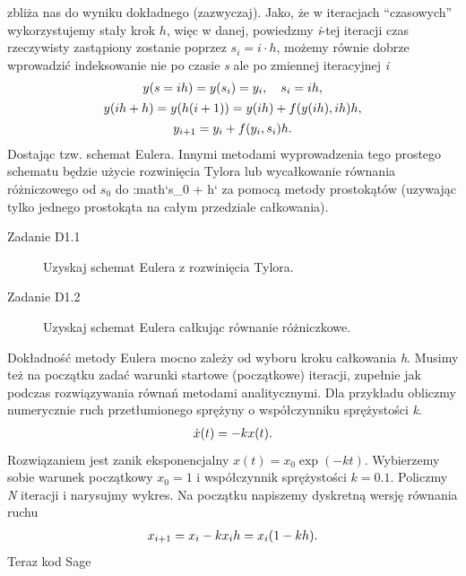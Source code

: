 \documentclass[a4paper,12pt,polish]{sphinxmanual}
\begin{document}
zbliża nas do wyniku dokładnego (zazwyczaj). Jako, że w iteracjach ``czasowych'' wykorzystujemy
stały krok $h$, więc w danej, powiedzmy \emph{i}-tej iteracji czas rzeczywisty zastąpiony zostanie
poprzez $s_i = i \cdot h$, możemy równie dobrze wprowadzić indeksowanie nie po czasie \emph{s} ale
po zmiennej iteracyjnej \emph{i}
\begin{gather}
\begin{split}y (s = ih) = y(s_i) = y_i, \quad s_i = i h,\end{split}\notag\\\begin{split}y (i h + h) = y(h(i+1)) = y(ih) + f(y(ih), ih) h,\end{split}\notag\\\begin{split}y_{i+1} = y_i + f(y_i,s_i) h.\end{split}\notag
\end{gather}
Dostając tzw. schemat Eulera. Innymi metodami wyprowadzenia tego prostego schematu będzie użycie
rozwinięcia Tylora lub wycałkowanie równania różniczowego od $s_0$ do :math{}`s\_0 + h{}`
za pomocą metody prostokątów (uzywając tylko jednego prostokąta na całym przedziale całkowania).
\begin{description}
\item[{Zadanie D1.1}] \leavevmode
Uzyskaj schemat Eulera z rozwinięcia Tylora.

\item[{Zadanie D1.2}] \leavevmode
Uzyskaj schemat Eulera całkując równanie różniczkowe.

\end{description}

Dokładność metody Eulera mocno zależy od wyboru kroku całkowania \emph{h}. Musimy też na początku zadać
warunki startowe (początkowe) iteracji, zupełnie jak podczas rozwiązywania równań metodami analitycznymi.
Dla przykładu obliczmy numerycznie ruch przetłumionego sprężyny o współczynniku sprężystości \emph{k}.
\begin{gather}
\begin{split}\dot{x}(t) = -k x(t).\end{split}\notag
\end{gather}
Rozwiązaniem jest zanik eksponencjalny $x(t) = x_0 \exp (-k t)$. Wybierzemy sobie warunek początkowy
$x_0 = 1$ i współczynnik sprężystości $k=0.1$. Policzmy \emph{N} iteracji i narysujmy wykres. Na
początku napiszemy dyskretną wersję równania ruchu
\begin{gather}
\begin{split}x_{i+1} = x_{i} - k x_i h = x_i (1 - kh).\end{split}\notag
\end{gather}
Teraz kod Sage
\end{document}
